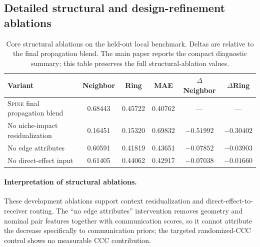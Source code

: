 \documentclass[sigconf,review,balance=false]{acmart}
\newcommand{\methodname}{\textsc{Spine}\xspace}
\begin{document}
\subsection{Detailed structural and design-refinement ablations}
\label{app:structural_design_refinement}

\begin{table}[t]
\centering
\caption{Core structural ablations on the held-out local benchmark. Deltas are relative to the final propagation blend. The main paper reports the compact diagnostic summary; this table preserves the full structural-ablation values.}
\label{tab:app_core_structural_ablations}
\small
\setlength{\tabcolsep}{5pt}
\renewcommand{\arraystretch}{1.12}
\begin{tabularx}{\textwidth}{@{}>{\raggedright\arraybackslash}Xccccc@{}}
\toprule
Variant & Neighbor & Ring & MAE & $\Delta$Neighbor & $\Delta$Ring \\
\midrule
\rowcolor{cyan!10}
\methodname{} final propagation blend &
0.68443 & 0.45722 & 0.40762 & --- & --- \\

No niche-impact residualization &
0.16451 & 0.15320 & 0.69832 & $-0.51992$ & $-0.30402$ \\

No edge attributes &
0.60591 & 0.41819 & 0.43651 & $-0.07852$ & $-0.03903$ \\

No direct-effect input &
0.61405 & 0.44062 & 0.42917 & $-0.07038$ & $-0.01660$ \\
\bottomrule
\end{tabularx}
\end{table}

\paragraph{Interpretation of structural ablations.}
These development ablations support context residualization and
direct-effect-to-receiver routing. The ``no edge attributes'' intervention
removes geometry and nominal pair features together with communication scores,
so it cannot attribute the decrease specifically to communication priors; the
targeted randomized-CCC control shows no measurable CCC contribution.
\end{document}
